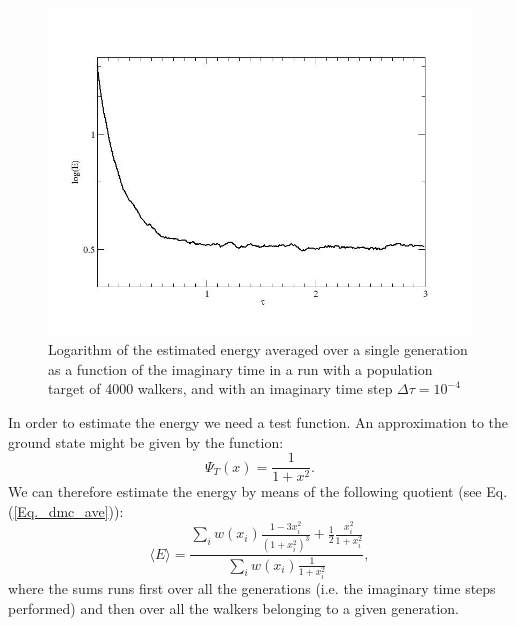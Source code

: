 \begin{figure}
	\begin{center}
		\includegraphics[scale=0.5]{Chapter9-figures/dmc_decay.jpg}
	\end{center}
	\caption{Logarithm of the estimated energy averaged over a single generation as a function of the imaginary time in a run with a population target of 4000 walkers, and with an imaginary time step $\Delta\tau=10^{-4}$}
	\label{fig.decay}
\end{figure}


In order to estimate the energy we need a test function. An approximation to the ground state might be given by the function:
\begin{equation}
\Psi_T(x)=\frac{1}{1+x^2}.
\end{equation}
We can therefore estimate the energy by means of the following quotient (see Eq. (\ref{Eq._dmc_ave})):
\begin{equation}
\langle E\rangle = \frac{\sum_{i} w(x_i)\frac{1-3x_i^2}{(1+x_i^2)^3}+\frac{1}{2}\frac{x_i^2}{1+x_i^2}}{\sum_iw(x_i)\frac{1}{1+x_i^2}},
\end{equation}
where the sums runs first over all the generations (i.e. the imaginary time steps performed) and then over all the walkers belonging to a given generation.


